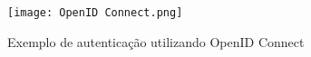 
\begin{figure}[ht]
    \centering
    \texttt{[image: OpenID Connect.png]}
    \caption{Exemplo de autenticação utilizando OpenID Connect}
    \label{fig:OpenID}
\end{figure}
